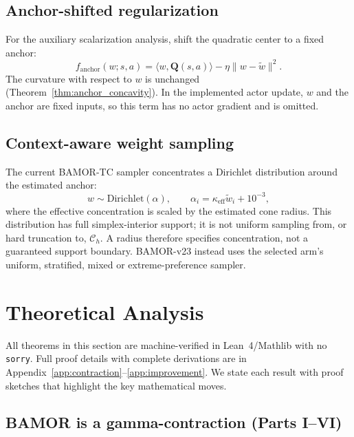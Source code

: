 \subsection{Anchor-shifted regularization}
\label{sec:anchor_reg}

For the auxiliary scalarization analysis, shift the quadratic center to a fixed anchor:
\begin{equation}
    f_{\mathrm{anchor}}(w; s,a) = \langle w, \mathbf{Q}(s,a) \rangle - \eta \|w - \tilde{w}\|^2.
    \label{eq:anchor_reg}
\end{equation}
The curvature with respect to $w$ is unchanged (Theorem~\ref{thm:anchor_concavity}). In the implemented actor update, $w$ and the anchor are fixed inputs, so this term has no actor gradient and is omitted.

\subsection{Context-aware weight sampling}
\label{sec:sampling}

The current BAMOR-TC sampler concentrates a Dirichlet distribution around the estimated anchor:
\begin{equation}
    w\sim\mathrm{Dirichlet}(\alpha),\qquad
    \alpha_i=\kappa_{\mathrm{eff}}\tilde w_i+10^{-3},
\end{equation}
where the effective concentration is scaled by the estimated cone radius. This distribution has full simplex-interior support; it is not uniform sampling from, or hard truncation to, $\mathcal C_h$. A radius therefore specifies concentration, not a guaranteed support boundary. BAMOR-v23 instead uses the selected arm's uniform, stratified, mixed or extreme-preference sampler.

\section{Theoretical Analysis}
\label{sec:theory}

All theorems in this section are machine-verified in Lean~4/Mathlib with no \texttt{sorry}.  Full proof details with complete derivations are in Appendix~\ref{app:contraction}--\ref{app:improvement}.  We state each result with proof sketches that highlight the key mathematical moves.

\subsection{BAMOR is a gamma-contraction (Parts I--VI)}
\label{sec:contraction}

